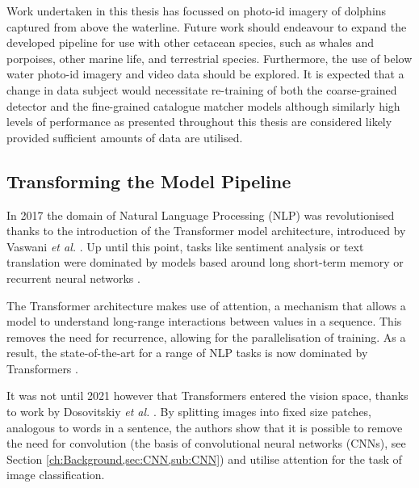 Work undertaken in this thesis has focussed on photo-id imagery of dolphins captured from above the waterline. Future work should endeavour to expand the developed pipeline for use with other cetacean species, such as whales and porpoises, other marine life, and terrestrial species. Furthermore, the use of below water photo-id imagery \cite{van_bressem_visual_2018} and video data should be explored. It is expected that a change in data subject would necessitate re-training of both the coarse-grained detector and the fine-grained catalogue matcher models although similarly high levels of performance as presented throughout this thesis are considered likely provided sufficient amounts of data are utilised. 

\subsection{Transforming the Model Pipeline}\label{ch:Conclusion,sec:FutureWork,sub:Transformers}

In 2017 the domain of Natural Language Processing (NLP) was revolutionised thanks to the introduction of the Transformer model architecture, introduced by Vaswani \textit{et al.} \cite{vaswani_attention_2017}. Up until this point, tasks like sentiment analysis or text translation were dominated by models based around long short-term memory \cite{hochreiter_long_1997} or recurrent neural networks \cite{rumelhart_learning_1985}. 

The Transformer architecture makes use of attention, a mechanism that allows a model to understand long-range interactions between values in a sequence. This removes the need for recurrence, allowing for the parallelisation of training. As a result, the state-of-the-art for a range of NLP tasks is now dominated by Transformers \cite{brown_language_2020, devlin_bert_2019, ng_facebook_2019, wolf_transformers_2020}. 

It was not until 2021 however that Transformers entered the vision space, thanks to work by Dosovitskiy \textit{et al.} \cite{dosovitskiy_image_2021}. By splitting images into fixed size patches, analogous to words in a sentence, the authors show that it is possible to remove the need for convolution (the basis of convolutional neural networks (CNNs), see Section \ref{ch:Background,sec:CNN,sub:CNN}) and utilise attention for the task of image classification. 

